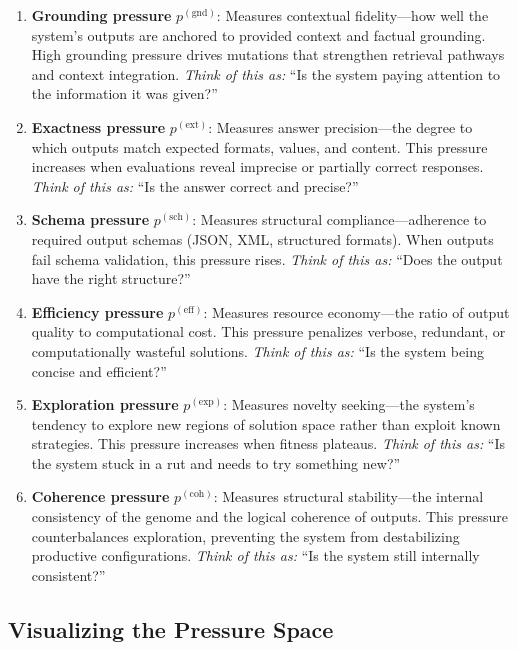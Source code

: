 \begin{enumerate}[leftmargin=1.8em]
  \item \textbf{Grounding pressure} $p^{(\text{gnd})}$: Measures contextual fidelity---how well the system's outputs are anchored to provided context and factual grounding. High grounding pressure drives mutations that strengthen retrieval pathways and context integration. \emph{Think of this as:} ``Is the system paying attention to the information it was given?''

  \item \textbf{Exactness pressure} $p^{(\text{ext})}$: Measures answer precision---the degree to which outputs match expected formats, values, and content. This pressure increases when evaluations reveal imprecise or partially correct responses. \emph{Think of this as:} ``Is the answer correct and precise?''

  \item \textbf{Schema pressure} $p^{(\text{sch})}$: Measures structural compliance---adherence to required output schemas (JSON, XML, structured formats). When outputs fail schema validation, this pressure rises. \emph{Think of this as:} ``Does the output have the right structure?''

  \item \textbf{Efficiency pressure} $p^{(\text{eff})}$: Measures resource economy---the ratio of output quality to computational cost. This pressure penalizes verbose, redundant, or computationally wasteful solutions. \emph{Think of this as:} ``Is the system being concise and efficient?''

  \item \textbf{Exploration pressure} $p^{(\text{exp})}$: Measures novelty seeking---the system's tendency to explore new regions of solution space rather than exploit known strategies. This pressure increases when fitness plateaus. \emph{Think of this as:} ``Is the system stuck in a rut and needs to try something new?''

  \item \textbf{Coherence pressure} $p^{(\text{coh})}$: Measures structural stability---the internal consistency of the genome and the logical coherence of outputs. This pressure counterbalances exploration, preventing the system from destabilizing productive configurations. \emph{Think of this as:} ``Is the system still internally consistent?''
\end{enumerate}

\subsection{Visualizing the Pressure Space}

